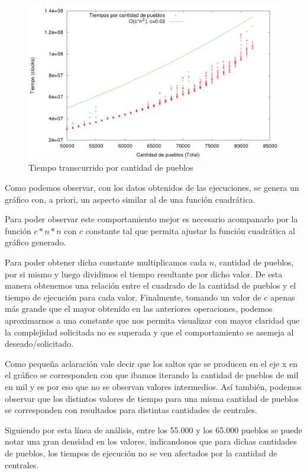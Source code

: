 \begin{center}
\begin{figure}[h!]
\includegraphics[scale=0.4]{./img/ej2_chart.png}
\caption{Tiempo transcurrido por cantidad de pueblos}
\end{figure}
\end{center}





Como podemos observar, con los datos obtenidos de las ejecuciones, se genera un gr\'afico con, a priori, un aspecto similar al de una funci\'on cuadr\'atica. 

Para poder observar este comportamiento mejor es necesario acompanarlo por la funci\'on $c*n*n$ con $c$ constante tal que permita ajustar la funci\'on cuadr\'atica al gr\'afico generado.

Para poder obtener dicha constante multiplicamos cada $n$, cantidad de pueblos, por si mismo y luego dividimos el tiempo resultante por dicho valor. De esta manera obtenemos una relaci\'on entre el cuadrado de la cantidad de pueblos y el tiempo de ejecuci\'on para cada valor. 
Finalmente, tomando un valor de $c$ apenas m\'as grande que el mayor obtenido en las anteriores operaciones, podemos aproximarnos a una constante que nos permita visualizar con mayor claridad que la complejidad solicitada no es superada y que el comportamiento se asemeja al deseado/solicitado.

Como peque\~na aclaraci\'on vale decir que los saltos que se producen en el eje x en el gr\'afico se corresponden con que ibamos iterando la cantidad de pueblos de mil en mil y es por eso que no se observan valores intermedios. 
As\'i tambi\'en, podemos observar que los distintos valores de tiempo para una misma cantidad de pueblos se corresponden con resultados para distintas cantidades de centrales.

Siguiendo por esta l\'inea de an\'alisis, entre los 55.000 y los 65.000 pueblos se puede notar una gran densidad en los valores, indicandonos que para dichas cantidades de pueblos, los tiempos de ejecuci\'on no se ven afectados por la cantidad de centrales.
